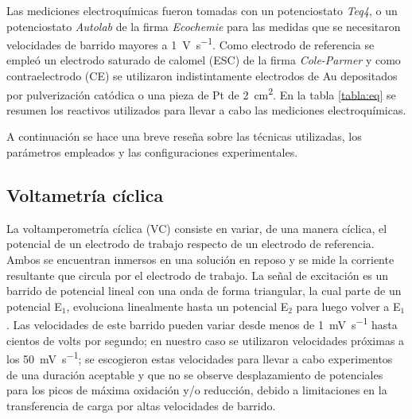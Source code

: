 			  	
			 		  
			Las mediciones electroquímicas fueron tomadas con un potenciostato \textit{Teq4}, o un potenciostato \textit{Autolab} de la firma \textit{Ecochemie} para las medidas que se necesitaron velocidades de barrido mayores a \SI{1}{\volt\per\second}. Como electrodo de referencia se empleó un electrodo saturado de calomel (ESC) de la firma \textit{Cole-Parmer} y como contraelectrodo (CE) se utilizaron indistintamente electrodos de Au depositados por pulverización catódica o una pieza de Pt de \SI{2}{\square\cm}. En la tabla \ref{tabla:eq} se resumen los reactivos utilizados para llevar a cabo las mediciones electroquímicas. 
			
			A continuación se hace una breve reseña sobre las técnicas utilizadas, los parámetros empleados y las configuraciones experimentales.

			
				
				   		  	
	 \subsection{Voltametría cíclica}
	 		
	 		La voltamperometría cíclica (VC) consiste en variar, de una manera cíclica, el potencial de un electrodo de trabajo respecto de un electrodo de referencia. Ambos se encuentran inmersos en una solución en reposo y se mide la corriente resultante que circula por el electrodo de trabajo. La señal de excitación es un barrido de potencial lineal con una onda de forma triangular, la cual parte de un potencial E$_1$, evoluciona linealmente hasta un potencial E$_2$ para luego volver a E$_1$. Las velocidades de este barrido pueden variar desde menos de \SI{1}{\milli\volt.\second^{-1}} hasta cientos de volts por segundo; en nuestro caso se utilizaron velocidades próximas a los \SI{50}{\milli\volt.\second^{-1}}; se escogieron estas velocidades para llevar a cabo experimentos de una duración aceptable y que no se observe desplazamiento de potenciales para los picos de máxima oxidación y/o reducción, debido a limitaciones en la transferencia de carga por altas velocidades de barrido. \cite{nicholson1964,Gewirth2004}

